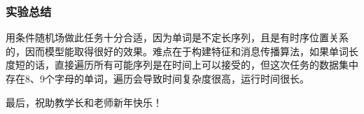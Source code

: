 \documentclass[a4paper,UTF8]{article}
\numberwithin{equation}{section}
\begin{document}
\subsubsection{实验总结}
用条件随机场做此任务十分合适，因为单词是不定长序列，且是有时序位置关系的，因而模型能取得很好的效果。难点在于构建特征和消息传播算法，如果单词长度短的话，直接遍历所有可能序列是在时间上可以接受的，但这次任务的数据集中存在8、9个字母的单词，遍历会导致时间复杂度很高，运行时间很长。

最后，祝助教学长和老师新年快乐！
\end{document}
